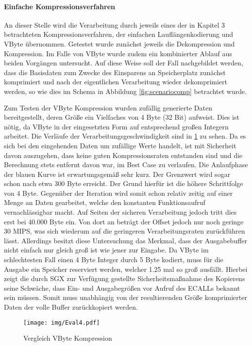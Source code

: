 \paragraph{Einfache Kompressionsverfahren}

An dieser Stelle wird die Verarbeitung durch jeweils eines der in Kapitel 3 betrachteten Kompressionsverfahren, der einfachen Lauflängenkodierung und VByte übernommen. Getestet wurde zunächst jeweils die Dekompression und Kompression. Im Falle von VByte wurde zudem ein kombinierter Ablauf aus beiden Vorgängen untersucht. Auf diese Weise soll der Fall nachgebildet werden, dass die Basisdaten zum Zwecke des Einsparens an Speicherplatz zunächst komprimiert und nach der eigentlichen Verarbeitung wieder dekomprimiert werden, so wie dies im Schema in Abbildung \ref{fig:scenariocomp} betrachtet wurde.

Zum Testen der VByte Kompression wurden zufällig generierte Daten bereitgestellt, deren Größe ein Vielfaches von 4 Byte (32 Bit) aufweist. Dies ist nötig, da VByte in der eingesetzten Form auf entsprechend großen Integern arbeitet. Die Verläufe der Verarbeitungsgeschwindigkeit sind in \ref{fig:eval4} zu sehen. Da es sich bei den eingehenden Daten um zufällige Werte handelt, ist mit Sicherheit davon auszugehen, dass keine guten Kompressionsraten entstanden sind und die Berechnung stets entfernt davon war, im Best Case zu verlaufen. Die Anlaufphase der blauen Kurve ist erwartungsgemäß sehr kurz. Der Grenzwert wird sogar schon nach etwa 300 Byte erreicht. Der Grund hierfür ist die höhere Schrittfolge von 4 Byte. Gegenüber der Iteration wird somit schon relativ zeitig auf einer Menge an Daten gearbeitet, welche den konstanten Funktionsaufruf vernachlässigbar macht. Auf Seiten der sicheren Verarbeitung jedoch tritt dies erst bei 40.000 Byte ein. Von dort an beträgt der Offset jedoch nur noch geringe 30 MIPS, was sich wiederum auf die geringeren Verarbeitungsraten zurückführen lässt. Allerdings besitzt diese Untersuchung das Merkmal, dass der Ausgabebuffer nicht einfach nur gleich groß ist wie jener zur Eingabe. Da VByte im schlechtesten Fall einen 4 Byte Integer durch 5 Byte kodiert, muss für die Ausgabe ein Speicher reserviert werden, welcher 1.25 mal so groß ausfällt. Hierbei zeigt die durch SGX zur Verfügung gestellte Sicherheitsmaßnahme des Kopierens seine Schwäche, dass Ein- und Ausgabegrößen vor Aufruf des ECALLs bekannt sein müssen. Somit muss unabhängig von der resultierenden Größe komprimierter Daten der volle Buffer zurückkopiert werden.

\begin{figure}[h]
	\texttt{[image: img/Eval4.pdf]}
	\centering
	\caption{Vergleich VByte Kompression}
	\label{fig:eval4}
\end{figure}

